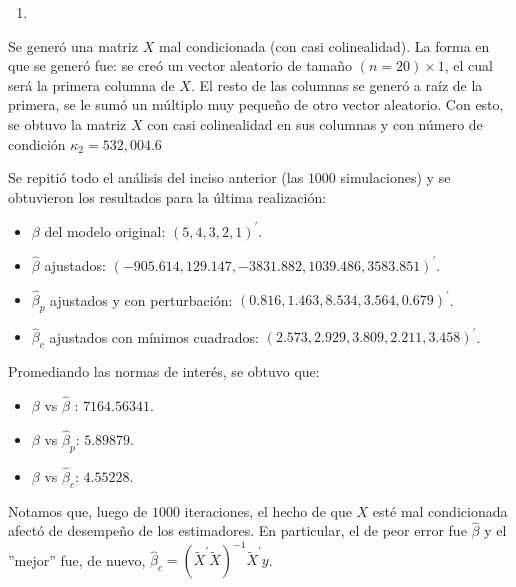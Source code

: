 {\color{blue}
	\begin{enumerate}[label=(\alph*), start=2]
		\item  
\end{enumerate}}

Se generó una matriz $X$ mal condicionada (con casi colinealidad). La forma en que se generó fue: se creó un vector aleatorio de tamaño $(n=20)\times 1$, el cual será la primera columna de $X$. El resto de las columnas se generó a raíz de la primera, se le sumó un múltiplo muy pequeño de otro vector aleatorio. Con esto, se obtuvo la matriz $X$ con casi colinealidad en sus columnas y con número de condición $\kappa_{2} = 532,004.6$

Se repitió todo el análisis del inciso anterior (las $1000$ simulaciones) y se obtuvieron los resultados para la última realización:
\begin{itemize}
	\item $\beta$ del modelo original: $\left(5, 4, 3, 2, 1\right)^{\prime}$.
	\item $\hat{\beta}$ ajustados: $\left( -905.614,   129.147, -3831.882,  1039.486,
	3583.851 \right)^{\prime}$.
	\item $\hat{\beta}_{p}$ ajustados y con perturbación: $\left( 0.816, 1.463,  8.534,  3.564, 0.679 \right)^{\prime}$.
	\item $\hat{\beta}_{c}$ ajustados con mínimos cuadrados: $\left( 2.573, 2.929, 3.809, 2.211, 3.458 \right)^{\prime}$.
\end{itemize}
Promediando las normas de interés, se obtuvo que:
\begin{itemize}
	\item $\beta$ vs $\hat{\beta}$ : $7164.56341$.
	\item $\beta$ vs $\hat{\beta}_p$: $5.89879$.
	\item $\beta$ vs $\hat{\beta}_c$: $4.55228$.
\end{itemize}
Notamos que, luego de $1000$ iteraciones, el hecho de que $X$ esté mal condicionada afectó de desempeño de los estimadores. En particular, el de peor error fue $\hat{\beta}$ y el ''mejor'' fue, de nuevo, $\hat{\beta}_c = \left(\tilde{X}^{\prime}\tilde{X}\right)^{-1}\tilde{X}^{\prime} y$.








